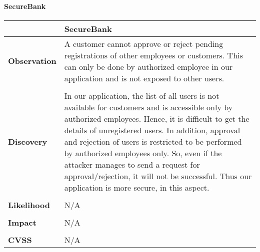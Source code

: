 \paragraph{SecureBank} \mbox{}
\begin{longtable*}{p{.20\textwidth} | p{.80\textwidth}}
    \hline
    & \textbf{SecureBank} \\
    \hline
    \textbf{Observation} &
       A customer cannot approve or reject pending registrations of other employees or customers. This can only be done by authorized employee in our application and is not exposed to other users. 
    \\\\
    \textbf{Discovery} &
    In our application, the list of all users is not available for customers and is accessible only by authorized employees. Hence, it is difficult to get the details of unregistered users. In addition, approval and rejection of users is restricted to be performed by authorized employees only. So, even if the attacker manages to send a request for approval/rejection, it will not be successful. Thus our application is more secure, in this aspect.
    \\\\
    \textbf{Likelihood} &
        N/A
    \\\\
    \textbf{Impact} &
        N/A
    \\\\
    \textbf{CVSS} &
        N/A
    \\
    \hline
\end{longtable*}
\clearpage